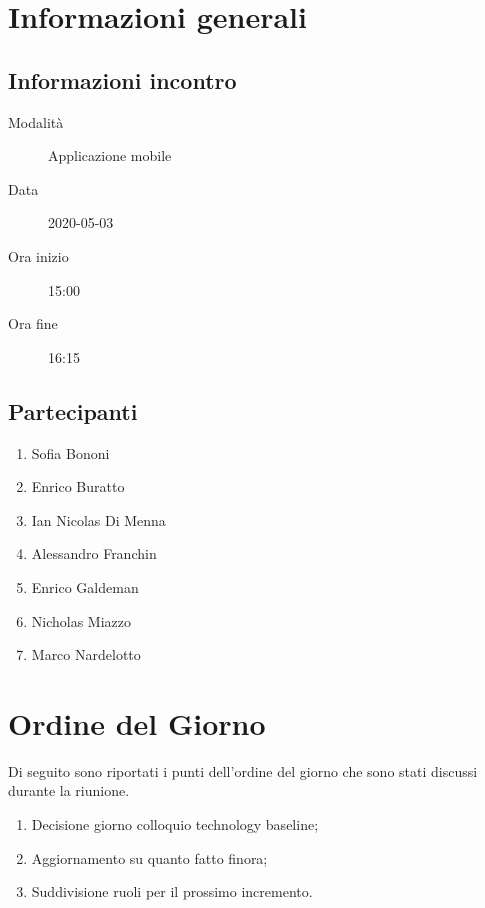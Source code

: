 \documentclass{article}
\begin{document}


\section{Informazioni generali}%
\label{sec:informazioni_generali}

\subsection{Informazioni incontro}%
\label{sub:informazioni_incontro}

\begin{description}
  \item[Modalità] Applicazione mobile 
  \item[Data] 2020-05-03
  \item[Ora inizio] 15:00
  \item[Ora fine] 16:15
\end{description}

\subsection{Partecipanti}%
\label{sub:partecipanti}

\begin{enumerate}
  \item Sofia Bononi
  \item Enrico Buratto
  \item Ian Nicolas Di Menna
  \item Alessandro Franchin
  \item Enrico Galdeman
  \item Nicholas Miazzo
  \item Marco Nardelotto
\end{enumerate}

\section{Ordine del Giorno}%
\label{ordine_del_giorno}
Di seguito sono riportati i punti dell'ordine del giorno che sono stati discussi durante la riunione.
\begin{enumerate}
  \item Decisione giorno colloquio technology baseline;
  \item Aggiornamento su quanto fatto finora;
  \item Suddivisione ruoli per il prossimo incremento.
\end{enumerate}
\end{document}
